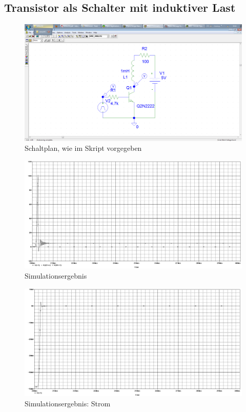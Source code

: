 \subsection{Transistor als Schalter mit induktiver Last}
\begin{figure}[H]
	\centering
	\includegraphics[width=\linewidth]{versuch5/spice/s5511.png}
	\caption{Schaltplan, wie im Skript vorgegeben}
\end{figure}
\begin{figure}[H]
	\centering
	\includegraphics[width=\linewidth]{versuch5/spice/5511.png}
	\caption{Simulationsergebnis}
\end{figure}
\begin{figure}[H]
	\centering
	\includegraphics[width=\linewidth]{versuch5/spice/5511I.png}
	\caption{Simulationsergebnis: Strom}
\end{figure}
